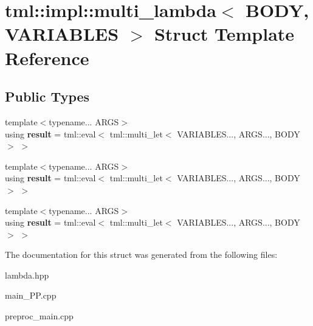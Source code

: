 \hypertarget{structtml_1_1impl_1_1multi__lambda}{\section{tml\+:\+:impl\+:\+:multi\+\_\+lambda$<$ B\+O\+D\+Y, V\+A\+R\+I\+A\+B\+L\+E\+S $>$ Struct Template Reference}
\label{structtml_1_1impl_1_1multi__lambda}
}
\subsection*{Public Types}
\begin{DoxyCompactItemize}
\item 
\hypertarget{structtml_1_1impl_1_1multi__lambda_aee819de14873162d61351d43f02d7479}{{\footnotesize template$<$typename... A\+R\+G\+S$>$ }\\using {\bfseries result} = tml\+::eval$<$ tml\+::multi\+\_\+let$<$ V\+A\+R\+I\+A\+B\+L\+E\+S..., A\+R\+G\+S..., B\+O\+D\+Y $>$ $>$}\label{structtml_1_1impl_1_1multi__lambda_aee819de14873162d61351d43f02d7479}

\item 
\hypertarget{structtml_1_1impl_1_1multi__lambda_aee819de14873162d61351d43f02d7479}{{\footnotesize template$<$typename... A\+R\+G\+S$>$ }\\using {\bfseries result} = tml\+::eval$<$ tml\+::multi\+\_\+let$<$ V\+A\+R\+I\+A\+B\+L\+E\+S..., A\+R\+G\+S..., B\+O\+D\+Y $>$ $>$}\label{structtml_1_1impl_1_1multi__lambda_aee819de14873162d61351d43f02d7479}

\item 
\hypertarget{structtml_1_1impl_1_1multi__lambda_aee819de14873162d61351d43f02d7479}{{\footnotesize template$<$typename... A\+R\+G\+S$>$ }\\using {\bfseries result} = tml\+::eval$<$ tml\+::multi\+\_\+let$<$ V\+A\+R\+I\+A\+B\+L\+E\+S..., A\+R\+G\+S..., B\+O\+D\+Y $>$ $>$}\label{structtml_1_1impl_1_1multi__lambda_aee819de14873162d61351d43f02d7479}

\end{DoxyCompactItemize}


The documentation for this struct was generated from the following files\+:\begin{DoxyCompactItemize}
\item 
lambda.\+hpp\item 
main\+\_\+\+P\+P.\+cpp\item 
preproc\+\_\+main.\+cpp\end{DoxyCompactItemize}
